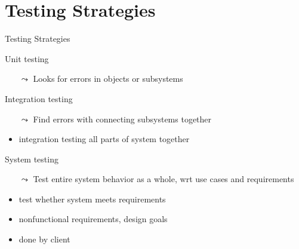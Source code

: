 \section{Testing Strategies}\sectionpage
\begin{frame}{Testing Strategies}
  \begin{block}{Unit testing}
    \begin{itemize}
    \item[$\leadsto$] Looks for errors in objects or subsystems
    \end{itemize}
  \end{block}
  \begin{block}{Integration testing}
    \begin{itemize}
    \item[$\leadsto$] Find errors with connecting subsystems together
    \item {} integration testing all parts
      of system together
    \end{itemize}  
  \end{block}

  \begin{block}{System testing}
    \begin{itemize}
    \item[$\leadsto$] Test entire system behavior as a whole, wrt
      use cases and requirements
    \item {} test whether system meets requirements
    \item {} nonfunctional requirements, design
      goals 
    \item {} done by client  
    \end{itemize}
  \end{block}
\end{frame}
